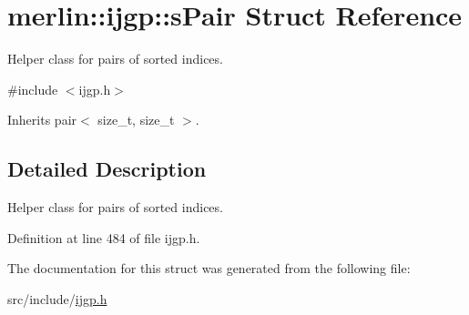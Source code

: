 \hypertarget{structmerlin_1_1ijgp_1_1sPair}{}\section{merlin\+:\+:ijgp\+:\+:s\+Pair Struct Reference}
\label{structmerlin_1_1ijgp_1_1sPair}


Helper class for pairs of sorted indices.  




{\ttfamily \#include $<$ijgp.\+h$>$}



Inherits pair$<$ size\+\_\+t, size\+\_\+t $>$.



\subsection{Detailed Description}
Helper class for pairs of sorted indices. 

Definition at line 484 of file ijgp.\+h.



The documentation for this struct was generated from the following file\+:\begin{DoxyCompactItemize}
\item 
src/include/\hyperlink{ijgp_8h}{ijgp.\+h}\end{DoxyCompactItemize}
